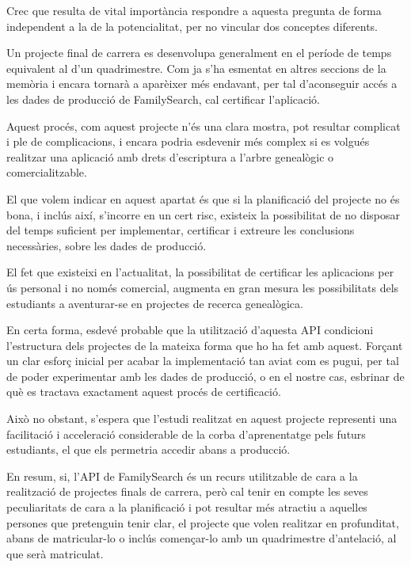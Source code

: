     Crec que resulta de vital importància respondre a aquesta pregunta de forma independent a la de la potencialitat, per no vincular dos conceptes diferents.

    Un projecte final de carrera es desenvolupa generalment en el període de temps equivalent al d'un quadrimestre. Com ja s'ha esmentat en altres seccions de la memòria i encara tornarà a aparèixer més endavant, per tal d'aconseguir accés a les dades de producció de FamilySearch, cal certificar l'aplicació.

    Aquest procés, com aquest projecte n'és una clara mostra, pot resultar complicat i ple de complicacions, i encara podria esdevenir més complex si es volgués realitzar una aplicació amb drets d'escriptura a l'arbre genealògic o comercialitzable.

    El que volem indicar en aquest apartat és que si la planificació del projecte no és bona, i inclús així, s'incorre en un cert risc, existeix la possibilitat de no disposar del temps suficient per implementar, certificar i extreure les conclusions necessàries, sobre les dades de producció.

    El fet que existeixi en l'actualitat, la possibilitat de certificar les aplicacions per ús personal i no només comercial, augmenta en gran mesura les possibilitats dels estudiants a aventurar-se en projectes de recerca genealògica.

    En certa forma, esdevé probable que la utilització d'aquesta API condicioni l'estructura dels projectes de la mateixa forma que ho ha fet amb aquest. Forçant un clar esforç inicial per acabar la implementació tan aviat com es pugui, per tal de poder experimentar amb les dades de producció, o en el nostre cas, esbrinar de què es tractava exactament aquest procés de certificació.

    Això no obstant, s'espera que l'estudi realitzat en aquest projecte representi una facilitació i acceleració considerable de la corba d'aprenentatge pels futurs estudiants, el que els permetria accedir abans a producció.

    En resum, si, l'API de FamilySearch és un recurs utilitzable de cara a la realització de projectes finals de carrera, però cal tenir en compte les seves peculiaritats de cara a la planificació i pot resultar més atractiu a aquelles persones que pretenguin tenir clar, el projecte que volen realitzar en profunditat, abans de matricular-lo o inclús començar-lo amb un quadrimestre d'antelació, al que serà matriculat.


